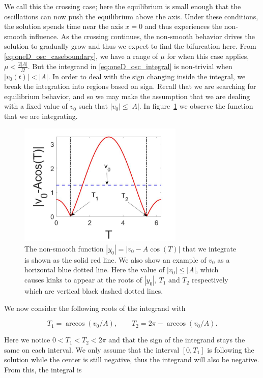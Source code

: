 We call this the crossing case; here the equilibrium is small enough that the oscillations can now push the equilibrium above the axis. Under these conditions, the solution spends time near the axis $x=0$ and thus experiences the non-smooth influence. As the crossing continues, the non-smooth behavior drives the solution to gradually grow and thus we expect to find the bifurcation here. From \eqref{eq:oneD_osc_caseboundary}, we have a range of $\mu$ for when this case applies, $\mu<\frac{2|A|}{\Omega}$. But the integrand in \eqref{eq:oneD_osc_integral} is non-trivial when $|v_0(t)|<|A|$. In order to deal with the sign changing inside the integral, we break the integration into regions based on sign. Recall that we are searching for equilibrium behavior, and so we may make the assumption that we are dealing with a fixed value of $v_0$ such that $|v_0|\le |A|$. In figure~\ref{fig:oneD_osc_t1t2_graphic} we observe the function that we are integrating.

\begin{figure}[H]
\centering
\includegraphics[width=0.7\textwidth]{oneD/t1t2_graphic.jpg}
\caption{The non-smooth function $|y_0|=|v_0-A\cos(T)|$ that we integrate is shown as the solid red line. We also show an example of $v_0$ as a horizontal blue dotted line. Here the value of $|v_0|\le|A|$, which causes kinks to appear at the roots of $|y_0|$, $T_1$ and $T_2$ respectively which are vertical black dashed dotted lines. }
\label{fig:oneD_osc_t1t2_graphic}
\end{figure}

We now consider the following roots of the integrand with 

\begin{equation*}
T_1=\arccos (v_0/A),\qquad T_2= 2\pi - \arccos (v_0/A).
\end{equation*}

Here we notice $0<T_1<T_2<2\pi$ and that the sign of the integrand stays the same on each interval. We only assume that the interval $[0,T_1]$ is following the solution while the center is still negative, thus the integrand will also be negative. From this, the integral is

